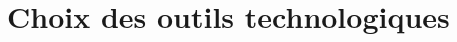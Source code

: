 \chapter{Choix des outils technologiques}
    
    \newpage
    
    \newpage
    
    \newpage
    
    \newpage
    



